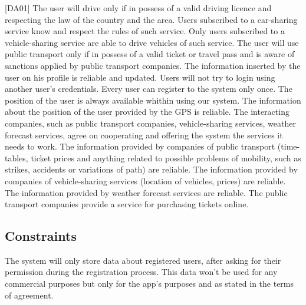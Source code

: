 \documentclass[a4paper,leqno]{book}
\begin{document}
[DA01] The user will drive only if in possess of a valid driving licence and respecting the law of the country and the area.
\newline
[DA02] Users subscribed to a car-sharing service know and respect the rules of such service.
\newline
[DA03] Only users subscribed to a vehicle-sharing service are able to drive vehicles of such service.
\newline
[DA04] The user will use public transport only if in possess of a valid ticket or travel pass and is aware of sanctions applied by public transport companies.
\newline
[DA05] The information inserted by the user on his profile is reliable and updated.
\newline
[DA06] Users will not try to login using another user's credentials.
\newline
[DA07] Every user can register to the system only once.
\newline
[DA08] The position of the user is always available whithin using our system.
\newline
[DA09] The information about the position of the user provided by the GPS is reliable.
\newline
[DA10] The interacting companies, such as public transport companies, vehicle-sharing services, weather forecast services, agree on cooperating and offering the system the services it needs to work.
\newline
[DA11] The information provided by companies of public transport (time-tables, ticket prices and anything related to possible problems of mobility, such as strikes, accidents or variations of path) are reliable.
\newline
[DA12] The information provided by companies of vehicle-sharing services (location of vehicles, prices) are reliable.
\newline
[DA13] The information provided by weather forecast services are reliable.
\newline[DA14] The public transport companies provide a service for purchasing tickets online.

\subsection{Constraints}
The system will only store data about registered users, after asking for their permission during the registration process. This data won't be used for any commercial purposes but only for the app's purposes and as stated in the terms of agreement.
\end{document}

